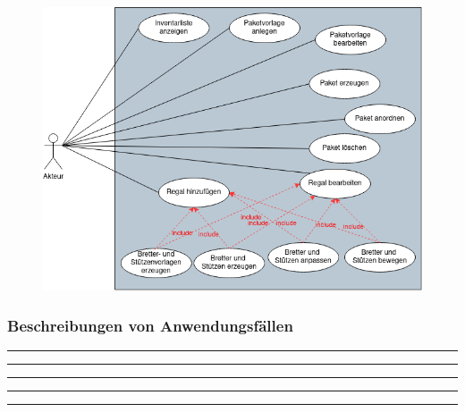 \begin{figure}[H]
    \includegraphics[width=\linewidth]{images/AnwendungsfallDiagramm.png}
    \label{fig:AnwendungsfallDiagramm}
\end{figure}
\clearpage
\subsubsection{Beschreibungen von Anwendungsf\"allen}

\par\noindent\rule{\textwidth}{0.4pt}

\par\noindent\rule{\textwidth}{0.4pt}

\par\noindent\rule{\textwidth}{0.4pt}

\par\noindent\rule{\textwidth}{0.4pt}

\par\noindent\rule{\textwidth}{0.4pt}


